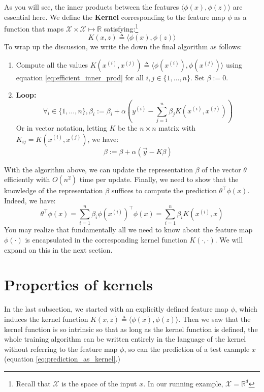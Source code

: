 As you will see, the inner products between the features $\langle\phi(x),\phi(z)\rangle$ are
essential here. We define the \textbf{Kernel} corresponding to the feature map $\phi$ as
a function that maps $\mathcal X \times \mathcal X \mapsto \mathbb{R}$ satisfying:\footnote{
Recall that $\mathcal X$ is the space of the input $x$. In our running example, $\mathcal X = \mathbb{R}^d$
}
\begin{equation}
    K(x,z) \triangleq \langle\phi(x),\phi(z)\rangle    
\end{equation}
To wrap up the discussion, we write the down the final algorithm as
follows:
\begin{enumerate}
    \item Compute all the values $K(x^{(i)} ,x^{(j)}) \triangleq \langle\phi(x^{(i)}),\phi(x^{(j)})\rangle$ using
          equation \ref{eq:efficient_inner_prod} for all $i,j \in \{1,\ldots ,n\}$. Set $\beta := 0$.
    \item \textbf{Loop:}
    \begin{equation}\label{eq:kernel_alg}
        \forall_i \in \{1,\ldots,n\},\beta_i := \beta_i + \alpha \left( y^{(i)} - \sum_{j=1}^n \beta_j K(x^{(i)}, x^{(j)}) \right)
    \end{equation}
    Or in vector notation, letting $K$ be the $n \times n$ matrix with $K_{ij} = K(x^{(i)},x^{(j)})$, we have: %
    \begin{equation*}
        \beta := \beta + \alpha(\vec{y} - K\beta)
    \end{equation*}
\end{enumerate}

With the algorithm above, we can update the representation $\beta$ of the
vector $\theta$ efficiently with $O(n^2)$ time per update. Finally, we need to show
that the knowledge of the representation $\beta$ suffices to compute the prediction
$\theta^\top \phi(x)$. Indeed, we have: %
\begin{equation}\label{eq:prediction_as_kernel}
    \theta^\top \phi(x) = \sum_{i=1}^n \beta_i \phi(x^{(i)})^\top \phi(x) = \sum_{i=1}^n \beta_i K(x^{(i)}, x)    
\end{equation}
You may realize that fundamentally all we need to know about the feature
map $\phi(\cdot)$ is encapsulated in the corresponding kernel function $K(\cdot,\cdot)$. We
will expand on this in the next section.

\section{Properties of kernels}
In the last subsection, we started with an explicitly defined feature map $\phi$,
which induces the kernel function $K(x,z) \triangleq \langle\phi(x),\phi(z)\rangle$. Then we saw that
the kernel function is so intrinsic so that as long as the kernel function is
defined, the whole training algorithm can be written entirely in the language
of the kernel without referring to the feature map $\phi$, so can the prediction of
a test example $x$ (equation \ref{eq:prediction_as_kernel}.)

